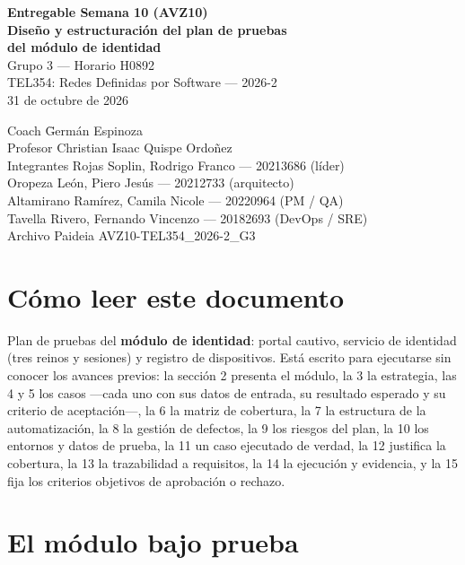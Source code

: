 \documentclass[11pt,a4paper]{article}
\begin{document}
\begin{titlepage}
\centering
\vspace*{1.2cm}
{\Large\bfseries Entregable Semana 10 (AVZ10)}\\[0.6cm]
{\LARGE\bfseries\color{azul} Diseño y estructuración del plan de pruebas\\[0.2cm] del módulo de identidad}\\[1.2cm]
{\large Grupo 3 --- Horario H0892}\\[0.2cm]
{\large TEL354: Redes Definidas por Software --- 2026-2}\\[0.2cm]
{\large 31 de octubre de 2026}\\[1.6cm]
\begin{tabbing}
Coach \hspace{1.4cm} \= Germán Espinoza\\[2pt]
Profesor \> Christian Isaac Quispe Ordoñez\\[2pt]
Integrantes \> Rojas Soplin, Rodrigo Franco --- 20213686 (líder)\\[2pt]
\> Oropeza León, Piero Jesús --- 20212733 (arquitecto)\\[2pt]
\> Altamirano Ramírez, Camila Nicole --- 20220964 (PM / QA)\\[2pt]
\> Tavella Rivero, Fernando Vincenzo --- 20182693 (DevOps / SRE)\\[6pt]
Archivo Paideia \> AVZ10-TEL354\_2026-2\_G3
\end{tabbing}
\end{titlepage}

\section*{Cómo leer este documento}
Plan de pruebas del \textbf{módulo de identidad}: portal cautivo, servicio de identidad (tres reinos y sesiones) y registro de dispositivos. Está escrito para ejecutarse sin conocer los avances previos: la sección 2 presenta el módulo, la 3 la estrategia, las 4 y 5 los casos ---cada uno con sus datos de entrada, su resultado esperado y su criterio de aceptación---, la 6 la matriz de cobertura, la 7 la estructura de la automatización, la 8 la gestión de defectos, la 9 los riesgos del plan, la 10 los entornos y datos de prueba, la 11 un caso ejecutado de verdad, la 12 justifica la cobertura, la 13 la trazabilidad a requisitos, la 14 la ejecución y evidencia, y la 15 fija los criterios objetivos de aprobación o rechazo.

\section{El módulo bajo prueba}
\end{document}
